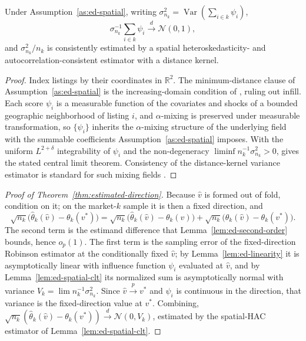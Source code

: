 \begin{lemma}\label{lem:ed-spatial-clt}
Under Assumption~\ref{as:ed-spatial}, writing $\sigma_{n_k}^2=\operatorname{Var}
(\sum_{i\in k}\psi_i)$,
\[
\sigma_{n_k}^{-1}\sum_{i\in k}\psi_i\xrightarrow{d}\mathcal N(0,1),
\]
and $\sigma_{n_k}^2/n_k$ is consistently estimated by a spatial
heteroskedasticity- and autocorrelation-consistent estimator with a distance kernel.
\end{lemma}

\begin{proof}
Index listings by their coordinates in $\mathbb{R}^2$. The minimum-distance clause of
Assumption~\ref{as:ed-spatial} is the increasing-domain condition of
\citet[Assumption~1]{jenish2009central}, ruling out infill. Each score $\psi_i$ is a
measurable function of the covariates and shocks of a bounded geographic neighborhood
of listing $i$, and $\alpha$-mixing is preserved under measurable transformation, so
$\{\psi_i\}$ inherits the $\alpha$-mixing structure of the underlying field with the
summable coefficients Assumption~\ref{as:ed-spatial} imposes. With the uniform
$L^{2+\delta}$ integrability of $\psi_i$ and the non-degeneracy $\liminf n_k^{-1}
\sigma_{n_k}^2>0$, \citet[Theorem~1]{jenish2009central} gives the stated central limit
theorem. Consistency of the distance-kernel variance estimator is standard for such
mixing fields \citep{conley1999gmm,bester2011inference}.
\end{proof}

\begin{proof}[Proof of Theorem~\ref{thm:estimated-direction}]
Because $\hat v$ is formed out of fold, condition on it; on the market-$k$ sample it is
then a fixed direction, and
\[
\sqrt{n_k}\bigl(\hat\theta_k(\hat v)-\theta_k(v^\ast)\bigr)
=\sqrt{n_k}\bigl(\hat\theta_k(\hat v)-\theta_k(\hat v)\bigr)
+\sqrt{n_k}\bigl(\theta_k(\hat v)-\theta_k(v^\ast)\bigr).
\]
The second term is the estimand difference that Lemma~\ref{lem:ed-second-order} bounds,
hence $o_p(1)$. The first term is the sampling error of the fixed-direction Robinson
estimator at the conditionally fixed $\hat v$; by Lemma~\ref{lem:ed-linearity} it is
asymptotically linear with influence function $\psi_i$ evaluated at $\hat v$, and by
Lemma~\ref{lem:ed-spatial-clt} its normalized sum is asymptotically normal with variance
$V_k=\lim n_k^{-1}\sigma_{n_k}^2$. Since $\hat v\xrightarrow{p}v^\ast$ and $\psi_i$ is
continuous in the direction, that variance is the fixed-direction value at $v^\ast$.
Combining, $\sqrt{n_k}(\hat\theta_k(\hat v)-\theta_k(v^\ast))\xrightarrow{d}\mathcal
N(0,V_k)$, estimated by the spatial-HAC estimator of Lemma~\ref{lem:ed-spatial-clt}.
\end{proof}

